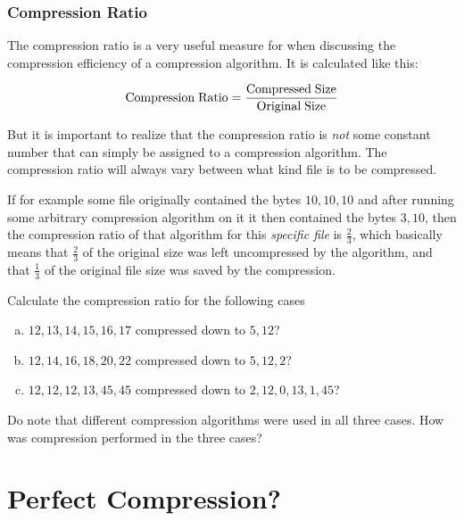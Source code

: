\subsection{Compression Ratio}

The compression ratio is a very useful
measure for when discussing the compression efficiency of a
compression algorithm. It is calculated like this:

\begin{equation*}
  {\rm Compression\;Ratio} = \frac{{\rm Compressed\; Size}}{{\rm Original\; Size}}
\end{equation*}

But it is important to realize that the compression ratio is
\textit{not} some constant number that can simply be assigned to a
compression algorithm. The compression ratio will always vary between
what kind file is to be compressed.

If for example some file originally contained the bytes $10,10,10$ and
after running some arbitrary compression algorithm on it it then
contained the bytes $3,10$, then the compression ratio of that
algorithm for this \textit{specific file} is $\frac{2}{3}$, which
basically means that $\frac{2}{3}$ of the original size was left
uncompressed by the algorithm, and that $\frac{1}{3}$ of the original
file size was saved by the compression.

\begin{Exercise}[label={compression-ratio}]

  Calculate the compression ratio for the following cases

  \begin{enumerate}[(a)]
  \item $12,13,14,15,16,17$ compressed down to $5,12$?
  \item $12,14,16,18,20,22$ compressed down to $5,12,2$?
  \item $12,12,12,13,45,45$ compressed down to $2,12,0,13,1,45$?
  \end{enumerate}

  Do note that different compression algorithms were used in all three
  cases. How was compression performed in the three cases?

\end{Exercise}

\chapter{Perfect Compression?}

